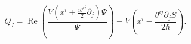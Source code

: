 \begin{equation}
Q_{I}=\operatorname{Re}\left(  \frac{V\left(  x^{i}+\frac{i\theta^{ij}}%
{2}\partial_{j}\right)  \Psi}{\Psi}\right)  -V\left(  x^{i}-\frac{\theta
^{ij}\partial_{j}S}{2\hbar}\right)  .\label{18}%
\end{equation}

